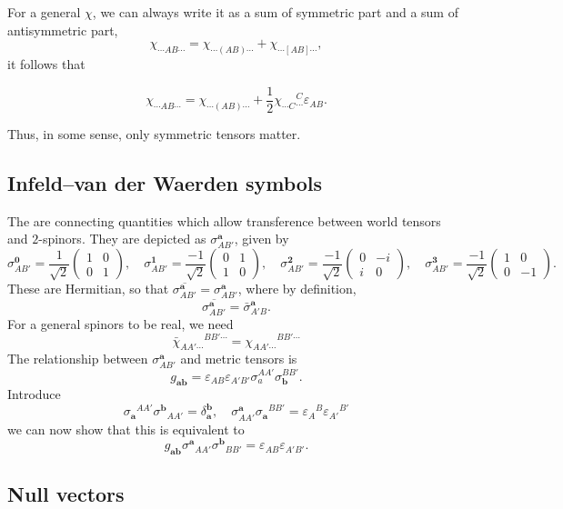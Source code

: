 \documentclass[a4paper]{article}
\begin{document}
For a general $\chi$, we can always write it as a sum of symmetric part and a sum of antisymmetric part,
\[
  \chi_{\cdots AB \cdots} = \chi_{\cdots (AB) \cdots} + \chi_{\cdots [AB] \cdots},
\]
it follows that
\begin{prop}
  \[
    \chi_{\cdots AB\cdots} = \chi_{\cdots (AB) \cdots} + \frac{1}{2} \chi_{\cdots C}\!^C_{\cdots} \varepsilon_{AB}.
  \]
\end{prop}
Thus, in some sense, only symmetric tensors matter.

\subsection{Infeld--van der Waerden symbols}
The  are connecting quantities which allow transference between world tensors and $2$-spinors. They are depicted as $\sigma^{\mathbf{a}}_{AB'}$, given by
\[
  \sigma^{\mathbf{0}}_{AB'} = \frac{1}{\sqrt{2}}
  \begin{pmatrix}
    1 & 0\\
    0 & 1
  \end{pmatrix},\quad \sigma^{\mathbf{1}}_{AB'} = \frac{-1}{\sqrt{2}}
  \begin{pmatrix}
    0 & 1\\
    1 & 0
  \end{pmatrix},\quad \sigma^{\mathbf{2}}_{AB'} = \frac{-1}{\sqrt{2}}
  \begin{pmatrix}
    0 & -i\\
    i & 0
  \end{pmatrix},\quad \sigma^{\mathbf{3}}_{AB'} = \frac{-1}{\sqrt{2}}
  \begin{pmatrix}
    1 & 0 \\
    0 & -1
  \end{pmatrix}.
\]
These are Hermitian, so that $\overline{\sigma^{\mathbf{a}}_{AB'}} = \sigma^\mathbf{a}_{AB'}$, where by definition,
\[
  \overline{\sigma^{\mathbf{a}}_{AB'}} = \bar{\sigma}^{\mathbf{a}}_{A'B}.
\]
For a general spinors to be real, we need
\[
  \bar{\chi}_{AA' \cdots}\!^{BB'\cdots} = \chi_{AA'\cdots }\!^{BB'\cdots}
\]
The relationship between $\sigma^{\mathbf{a}}_{AB'}$ and metric tensors is
\[
  g_{\mathbf{a}\mathbf{b}} = \varepsilon_{AB} \varepsilon_{A'B'} \sigma_a^{AA'} \sigma_\mathbf{b}^{BB'}.
\]
Introduce
\[
  \sigma_{\mathbf{a}}\!^{AA'} \sigma^{\mathbf{b}}\!_{AA'} = \delta_{\mathbf{a}}^{\mathbf{b}},\quad \sigma^{\mathbf{a}}_{AA'} \sigma_{\mathbf{a}}\!^{BB'} = \varepsilon_A\!^B \varepsilon_{A'}\!^{B'}
\]
we can now show that this is equivalent to
\[
  g_{\mathbf{a}\mathbf{b}} \sigma^{\mathbf{a}}\!_{AA'} \sigma^\mathbf{b}\!_{BB'} = \varepsilon_{AB} \varepsilon_{A'B'}.
\]
\subsection{Null vectors}

\printindex
\end{document}
